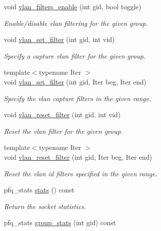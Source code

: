 \begin{DoxyCompactItemize}
void \hyperlink{classpfq_1_1socket_aaf91b2e089edb2c4695584b01774326e}{vlan\+\_\+filters\+\_\+enable} (int gid, bool toggle)
\begin{DoxyCompactList}\small\item\em Enable/disable vlan filtering for the given group. \end{DoxyCompactList}\item 
void \hyperlink{classpfq_1_1socket_a92eeaf78ff595546c517b5699c9a5b1e}{vlan\+\_\+set\+\_\+filter} (int gid, int vid)
\begin{DoxyCompactList}\small\item\em Specify a capture vlan filter for the given group. \end{DoxyCompactList}\item 
{\footnotesize template$<$typename Iter $>$ }\\void \hyperlink{classpfq_1_1socket_aee0fbc6a5f899d081c659dbaa4a4a235}{vlan\+\_\+set\+\_\+filter} (int gid, Iter beg, Iter end)
\begin{DoxyCompactList}\small\item\em Specify the vlan capture filters in the given range. \end{DoxyCompactList}\item 
void \hyperlink{classpfq_1_1socket_a296d1eddfb061c1a658067006ddb9f37}{vlan\+\_\+reset\+\_\+filter} (int gid, int vid)
\begin{DoxyCompactList}\small\item\em Reset the vlan filter for the given group. \end{DoxyCompactList}\item 
{\footnotesize template$<$typename Iter $>$ }\\void \hyperlink{classpfq_1_1socket_a18efa89248a6d6bfb29d575744d21608}{vlan\+\_\+reset\+\_\+filter} (int gid, Iter beg, Iter end)
\begin{DoxyCompactList}\small\item\em Reset the vlan id filters specified in the given range. \end{DoxyCompactList}\item 
pfq\+\_\+stats \hyperlink{classpfq_1_1socket_a0a0a637d733613bf86d6d85168d2e37f}{stats} () const 
\begin{DoxyCompactList}\small\item\em Return the socket statistics. \end{DoxyCompactList}\item 
pfq\+\_\+stats \hyperlink{classpfq_1_1socket_a39397866032a4654c4dc000185c61e01}{group\+\_\+stats} (int gid) const 

\end{DoxyCompactItemize}
